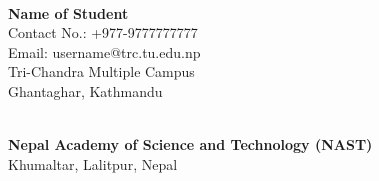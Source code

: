 \vfill
\begin{center}
\\
\textbf{Name of Student}\\
Contact No.: +977-9777777777\\
Email: username@trc.tu.edu.np\\
Tri-Chandra Multiple Campus\\
Ghantaghar, Kathmandu\\
\end{center}

\vfill

\begin{center}
\fontsize{12pt}{14pt}\selectfont
{}\\
\textbf{Nepal Academy of Science and Technology (NAST)}\\
Khumaltar, Lalitpur, Nepal
\end{center}
